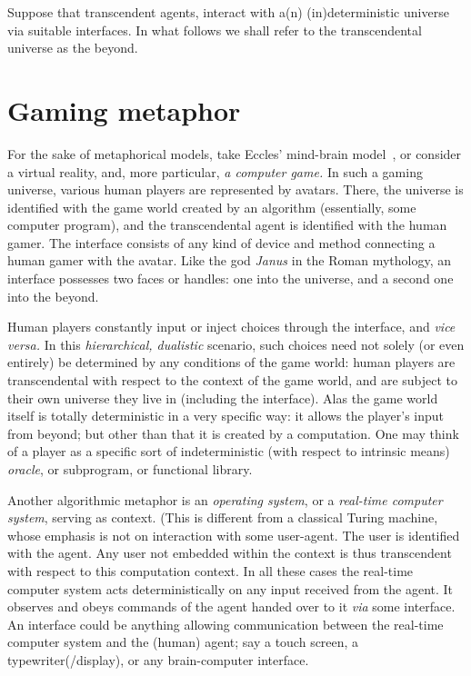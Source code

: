 Suppose that transcendent agents, interact with a(n) (in)deterministic universe
via suitable interfaces. In what follows we shall refer to the transcendental
universe as the beyond.

\section{Gaming metaphor}
\label{2016-pu-book-chapter-di-section-gm} %

For the sake of  metaphorical models,
take Eccles' mind-brain model~\cite{eccles:papal},
or consider a virtual reality, and, more particular, {\em a computer game.} In such a gaming universe, various human players are represented
by avatars.
There, the universe is identified with the game world created by an algorithm (essentially, some computer program),
and the transcendental agent is identified with the human gamer.
The interface consists of any kind of device and method connecting a human gamer with the avatar.
Like the god {\em Janus} in the Roman mythology, an interface possesses two faces or handles: one into the universe, and a second one into the beyond.

Human players constantly input or inject choices through the interface, and {\it vice versa.}
In this {\em hierarchical, dualistic} scenario, such choices need not solely (or even entirely) be determined
by any conditions of the game world:
human players are transcendental with respect to the context of the game world,
and are subject to their own universe they live in (including the interface).
Alas the game world itself is totally deterministic in a very specific way:
it allows the player's input from beyond; but other than that it is created by a computation.
One may think of a player as a specific sort of indeterministic (with respect to intrinsic means)
{\em oracle}, or subprogram, or functional library.

Another algorithmic metaphor is an {\em operating system},
or a {\em real-time computer system}, serving as context.
(This is different from a classical Turing machine, whose emphasis is not on interaction with some user-agent.
The user is identified with the agent.
Any user not embedded within the context is thus transcendent with respect to this computation context.
In all these cases the  real-time computer system acts deterministically on any input received from the agent.
It observes and obeys commands of the agent handed over to it {\em via} some interface.
An interface could be anything allowing communication between the real-time computer system and the (human) agent;
say a touch screen, a typewriter(/display), or any brain-computer interface.

